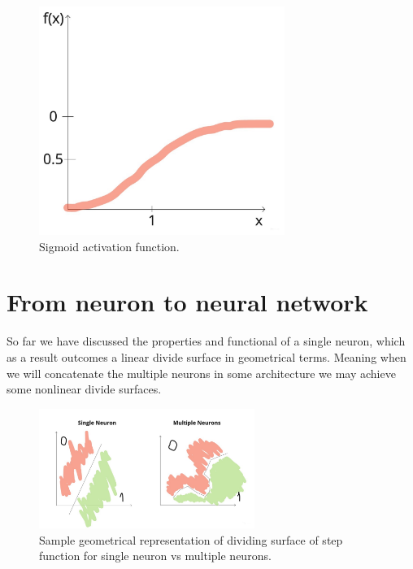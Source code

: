 \begin{figure}[h]
    \centering \includegraphics[width=8cm]{images/sigmoid_function.jpg}
    \caption {Sigmoid activation function.}
\end{figure}

\section{From neuron to neural network}
So far we have discussed the properties and functional of a single neuron, which as a result outcomes a linear divide surface in geometrical terms. Meaning when we will concatenate the multiple neurons in some architecture we may achieve some nonlinear divide surfaces.
\begin{figure}[h]
    \centering \includegraphics[width=7cm]{images/neuron_to_neural_net.jpg}
    \caption {Sample geometrical representation of dividing surface of step function for single neuron vs multiple neurons.}
\end{figure}

